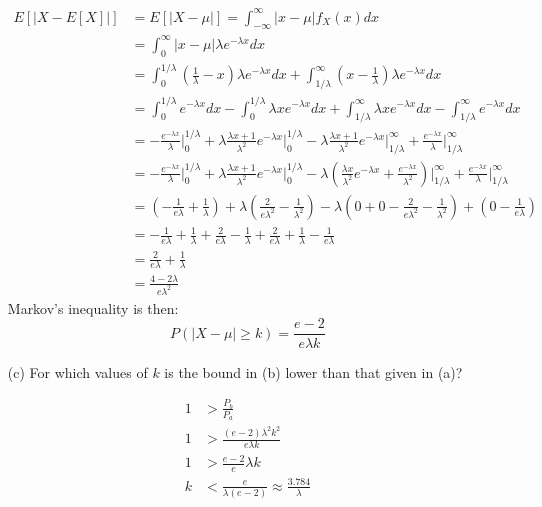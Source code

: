 \documentclass{article}
\newcommand{\1}{\mathbf{1}}
\begin{document}
\begin{enumerate}
    \begin{align*}
        E[|X - E[X]|] &= E[|X - \mu|] = \int_{-\infty}^\infty |x-\mu|f_X(x) dx \\
        &= \int_{0}^\infty |x-\mu|\lambda e^{-\lambda x} dx \\
        &= \int_0^{1/\lambda} \left(\frac{1}{\lambda} - x\right)\lambda e^{-\lambda x} dx 
            + \int_{1/\lambda}^\infty \left(x - \frac{1}{\lambda} \right)\lambda e^{-\lambda x} dx \\
        &= \int_0^{1/\lambda} e^{-\lambda x} dx 
            - \int_0^{1/\lambda} \lambda xe^{-\lambda x} dx
            + \int_{1/\lambda}^\infty \lambda  xe^{-\lambda x} dx 
            - \int_{1/\lambda}^\infty e^{-\lambda x} dx \\
        &= -\frac{e^{-\lambda x}}{\lambda} \bigg|_0^{1/\lambda} 
            + \lambda \frac{\lambda x+1}{\lambda^2}e^{-\lambda x} \bigg|_0^{1/\lambda}
            - \lambda \frac{\lambda x+1}{\lambda^2}e^{-\lambda x} \bigg|_{1/\lambda}^\infty 
            + \frac{e^{-\lambda x}}{\lambda} \bigg|_{1/\lambda}^\infty \\
        &= -\frac{e^{-\lambda x}}{\lambda} \bigg|_0^{1/\lambda} 
            + \lambda \frac{\lambda x+1}{\lambda^2}e^{-\lambda x} \bigg|_0^{1/\lambda}
            - \lambda \left(\frac{\lambda x}{\lambda^2}e^{-\lambda x} + \frac{e^{-\lambda x}}{\lambda^2} \right)\bigg|_{1/\lambda}^\infty 
            + \frac{e^{-\lambda x}}{\lambda} \bigg|_{1/\lambda}^\infty \\
        &= \left(-\frac{1}{e\lambda}+ \frac{1}{\lambda}\right) 
            + \lambda \left(\frac{2}{e\lambda^2} - \frac{1}{\lambda^2} \right) 
            - \lambda \left(0 + 0 - \frac{2}{e\lambda^2} - \frac{1}{\lambda^2}\right) 
            + \left(0 - \frac{1}{e\lambda}\right) \\
        &= -\frac{1}{e\lambda} + \frac{1}{\lambda} 
           + \frac{2}{e\lambda} - \frac{1}{\lambda}  
           + \frac{2}{e\lambda} + \frac{1}{\lambda} 
           - \frac{1}{e\lambda}\\
        &= \frac{2}{e\lambda} + \frac{1}{\lambda} \\
        &= \frac{4-2\lambda}{e\lambda^2}
    \end{align*}
    Markov's inequality is then:
    $$P(|X-\mu|\geq k) = \frac{e-2}{e \lambda k}$$

    \item[(c)] For which values of $k$ is the bound in (b) lower than that given in (a)?
    
    \begin{align*}
        1 &> \frac{P_b}{P_a}\\
        1 &>\frac{(e-2)\lambda^2 k^2}{e\lambda k} \\ %
        1 &> \frac{e-2}{e}\lambda k \\
        k &< \frac{e}{\lambda (e-2)} \approx \frac{3.784}{\lambda}
    \end{align*}
\end{enumerate}
\end{document}
